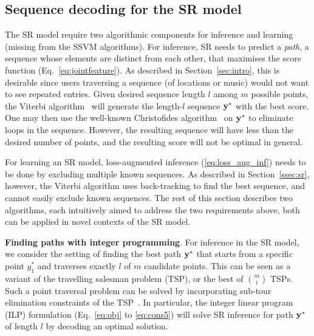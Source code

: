 \subsection{Sequence decoding for the SR model}
\label{ssec:subtour}

The SR model require two algorithmic components for inference and learning
(missing from the SSVM algorithms).
For inference, SR needs to predict a {\em path}, \ie a sequence whose elements are distinct from each other,
that maximises the score function (Eq.~\ref{eq:jointfeature}).
As described in Section~\ref{sec:intro}, this is desirable since users traversing a sequence (of locations or music)
would not want to see repeated entries.
Given desired sequence length $l$ among $m$ possible points, the Viterbi algorithm~\cite{tsochantaridis2005large}
will generate the length-$l$ sequence $\mathbf{y}^*$ with the best score. %
One may then use the well-known
Christofides algorithm~\cite{christofides1976} on $\mathbf{y}^*$ to eliminate loops in the sequence.
However, the resulting sequence will have less than the desired number of points, and the resulting score will not be optimal in general.

For learning an SR model, loss-augmented inference (\ref{eq:loss_aug_inf}) needs to be done by excluding multiple known sequences.
As described in Section~\ref{ssec:sr}, %
however, the Viterbi algorithm uses back-tracking to find the best sequence,
and cannot easily exclude known sequences.
The rest of this section describes two algorithms, each intuitively aimed to address %
the two requirements above, both can be applied in novel contexts of the SR model.


\textbf{Finding paths with integer programming}.
For inference in the SR model, 
we consider the setting of finding the best path $\mathbf{y}^*$ that starts from a specific point $y_1^*$ and traverses exactly $l$ of $m$ candidate points.
This can be seen as a variant of the travelling salesman problem (TSP), or the best of ${m \choose l}$ TSPs.
Such a point traversal problem can be solved by incorporating
sub-tour elimination constraints of the TSP~\cite{ijcai15,cikm16paper}.
In particular, the integer linear program (ILP) formulation (Eq.~\ref{eq:obj} to \ref{eq:cons5})
will solve SR inference for path $\mathbf{y}^*$ of length $l$ by decoding an optimal solution.

